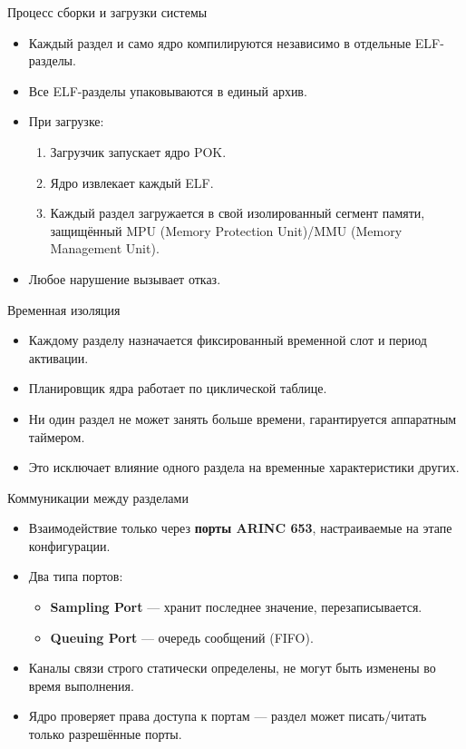 \begin{frame}{Процесс сборки и загрузки системы}
    \begin{itemize}
        \item Каждый раздел и само ядро компилируются независимо в отдельные ELF-разделы.
        \item Все ELF-разделы упаковываются в единый архив.
        \item При загрузке:
        \begin{enumerate}
            \item Загрузчик запускает ядро POK.
            \item Ядро извлекает каждый ELF.
            \item Каждый раздел загружается в свой изолированный сегмент памяти, защищённый MPU (Memory Protection Unit)/MMU (Memory Management Unit).
        \end{enumerate}
        \item Любое нарушение вызывает отказ.
    \end{itemize}
\end{frame}

\begin{frame}{Временная изоляция}
    \begin{itemize}
        \item Каждому разделу назначается фиксированный временной слот и период активации.
        \item Планировщик ядра работает по циклической таблице.
        \item Ни один раздел не может занять больше времени, гарантируется аппаратным таймером.
        \item Это исключает влияние одного раздела на временные характеристики других.
    \end{itemize}
\end{frame}

\begin{frame}{Коммуникации между разделами}
    \begin{itemize}
        \item Взаимодействие только через \textbf{порты ARINC 653}, настраиваемые на этапе конфигурации.
        \item Два типа портов:
        \begin{itemize}
            \item \textbf{Sampling Port} — хранит последнее значение, перезаписывается.
            \item \textbf{Queuing Port} — очередь сообщений (FIFO).
        \end{itemize}
        \item Каналы связи строго статически определены, не могут быть изменены во время выполнения.
        \item Ядро проверяет права доступа к портам — раздел может писать/читать только разрешённые порты.
    \end{itemize}
\end{frame}

